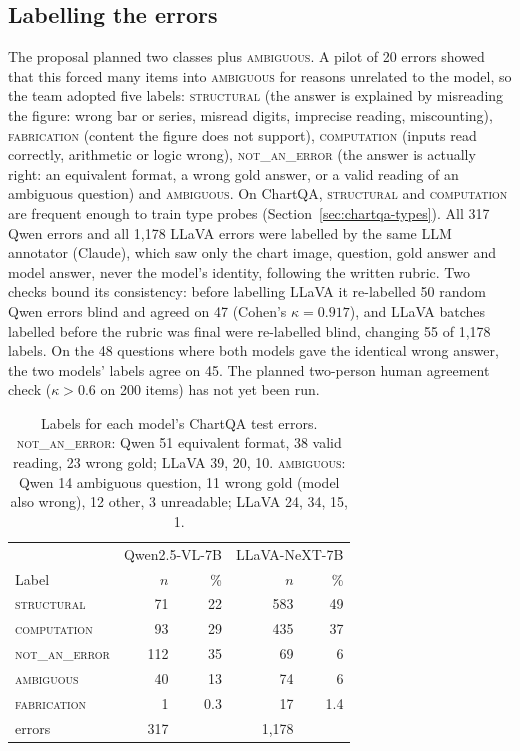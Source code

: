 \documentclass[11pt]{article}
\newcommand{\qwen}{Qwen2.5-VL-7B\xspace}
\newcommand{\llava}{LLaVA-NeXT-7B\xspace}
\newcommand{\cls}[1]{\textsc{#1}}
\begin{document}
\subsection{Labelling the errors}
The proposal planned two classes plus \cls{ambiguous}. A pilot of 20 errors
showed that this forced many items into \cls{ambiguous} for reasons unrelated to
the model, so the team adopted five labels: \cls{structural} (the answer is
explained by misreading the figure: wrong bar or series, misread digits,
imprecise reading, miscounting), \cls{fabrication} (content the figure does not
support), \cls{computation} (inputs read correctly, arithmetic or logic wrong),
\cls{not\_an\_error} (the answer is actually right: an equivalent format, a
wrong gold answer, or a valid reading of an ambiguous question) and
\cls{ambiguous}. On ChartQA, \cls{structural} and \cls{computation} are frequent
enough to train type probes (Section~\ref{sec:chartqa-types}).
All 317 Qwen errors and all 1,178 LLaVA errors were labelled by the same LLM
annotator (Claude), which saw only the chart image, question, gold answer and
model answer, never the model's identity, following the written rubric. Two
checks bound its consistency: before labelling LLaVA it re-labelled 50 random
Qwen errors blind and agreed on 47 (Cohen's $\kappa=0.917$), and LLaVA batches
labelled before the rubric was final were re-labelled blind, changing 55 of
1,178 labels. On the 48 questions where both models gave the identical wrong
answer, the two models' labels agree on 45. The planned two-person human
agreement check ($\kappa>0.6$ on 200 items) has not yet been run.

\begin{table}[t]
\centering\small\setlength{\tabcolsep}{4pt}
\begin{tabular}{lrrrr}
\toprule
 & \multicolumn{2}{c}{\qwen} & \multicolumn{2}{c}{\llava} \\
Label & $n$ & \% & $n$ & \% \\
\midrule
\cls{structural} & 71 & 22 & 583 & 49 \\
\cls{computation} & 93 & 29 & 435 & 37 \\
\cls{not\_an\_error} & 112 & 35 & 69 & 6 \\
\cls{ambiguous} & 40 & 13 & 74 & 6 \\
\cls{fabrication} & 1 & 0.3 & 17 & 1.4 \\
\midrule
errors & 317 & & 1,178 & \\
\bottomrule
\end{tabular}
\caption{Labels for each model's ChartQA test errors. \cls{not\_an\_error}:
Qwen 51 equivalent format, 38 valid reading, 23 wrong gold; LLaVA 39, 20, 10.
\cls{ambiguous}: Qwen 14 ambiguous question, 11 wrong gold (model also wrong),
12 other, 3 unreadable; LLaVA 24, 34, 15, 1.}
\label{tab:labels}
\end{table}
\end{document}
